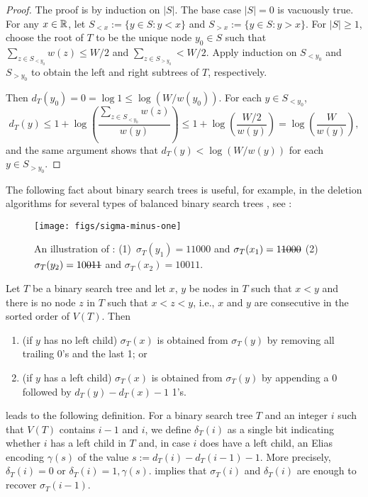 \documentclass[kpfonts]{patmorin}
\let\le\leqslant
\let\ge\geqslant
\begin{document}
\begin{proof}
  The proof is by induction on $|S|$. The base case $|S|=0$ is vacuously true.
  For any $x\in\mathbb{R}$, let $S_{<x}:=\{y\in S: y < x\}$ and $S_{>x}:=\{y\in S: y>x\}$. For $|S|\ge 1$, choose the root of $T$ to be the unique node $y_0\in S$ such that $\sum_{z\in S_{<y_0}} w(z)\le W/2$ and $\sum_{z\in S_{>y_0}}< W/2$. Apply induction on $S_{<y_0}$ and $S_{>y_0}$ to obtain the left and right subtrees of $T$, respectively.

  Then $d_T(y_0)=0=\log 1\le \log (W/w(y_0))$.  For each $y\in S_{<y_0}$,
  \[
    d_T(y) \le 1 + \log\left(\frac{\sum_{z\in S_{<y_0}}w(z)}{w(y)}\right)
            \le 1 + \log \left(\frac{W/2}{w(y)}\right)
            = \log \left(\frac{W}{w(y)}\right) ,
  \]
  and the same argument shows that $d_T(y) < \log (W/w(y))$ for each $y\in S_{>y_0}$.
\end{proof}

The following fact about binary search trees is useful, for example, in the deletion algorithms for several types of balanced binary search trees \cite[Section~6.2.3]{morin:open}, see :

\begin{figure}
  \begin{center}
    \texttt{[image: figs/sigma-minus-one]}
  \end{center}
  \caption{An illustration of : (1)~$\sigma_T(y_1)=11000$ and $\sigma_T(x_1)=1\mbox{\sout{1000}}$ (2)~$\sigma_T(y_2)=10\mbox{\sout{011}}$ and $\sigma_T(x_2)=10011$.}
\end{figure}

\begin{obs}
  Let $T$ be a binary search tree and let $x$, $y$ be nodes in $T$ such that $x<y$ and there is no node $z$ in $T$ such that $x<z<y$, i.e., $x$ and $y$ are consecutive in the sorted order of $V(T)$.  Then
  \begin{enumerate}
    \item (if $y$ has no left child) $\sigma_T(x)$ is obtained from $\sigma_T(y)$ by removing all trailing 0's and the last 1; or
    \item (if $y$ has a left child) $\sigma_T(x)$ is obtained from $\sigma_T(y)$ by appending a 0 followed by $d_T(y)-d_T(x)-1$ 1's.
  \end{enumerate}
\end{obs}

 leads to the following definition. For a binary search tree $T$ and an integer $i$ such that $V(T)$ contains $i-1$ and $i$, we define $\delta_T(i)$ as
a single bit indicating whether $i$ has a left child in $T$ and, in case $i$ does have a left child, an Elias encoding $\gamma(s)$ of the value $s:=d_T(i)-d_T(i-1)-1$.  More precisely, $\delta_T(i)=0$ or $\delta_T(i)=1,\gamma(s)$.  implies that $\sigma_T(i)$ and $\delta_T(i)$ are enough to recover $\sigma_T(i-1)$.
\end{document}
